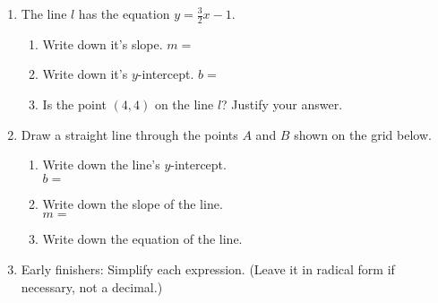 \documentclass[12pt, twoside]{article}
\begin{document}
\begin{enumerate}
\newpage
\item The line $l$ has the equation $y=\frac{3}{2}x-1$. 
\begin{enumerate}
  \item Write down it's slope. $m=$
  \vspace{0.5cm}
  \item Write down it's $y$-intercept. $b=$
  \vspace{0.5cm}
  \item Is the point $(4, 4)$ on the line $l$? Justify your answer.
\end{enumerate}
\vspace{2.5cm}

\item Draw a straight line through the points $A$ and $B$ shown on the grid below.
\begin{multicols}{2}
\begin{enumerate}
  \item Write down the line's $y$-intercept.\\ $b=$
  \vspace{0.25cm}
  \item Write down the slope of the line.\\ $m=$
  \vspace{0.25cm}
  \item Write down the equation of the line.
\end{enumerate}
  \begin{center} %
  \end{center}
\end{multicols}
\vspace{2.5cm}

\item Early finishers: Simplify each expression. (Leave it in radical form if necessary, not a decimal.)
\begin{enumerate}
\end{enumerate}
\vspace{0.5cm}

\end{enumerate}
\end{document}
